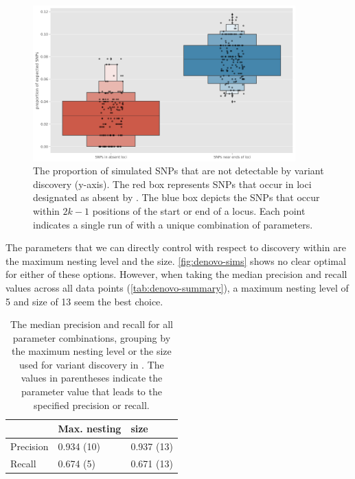 \begin{figure}
    \centering
    \includegraphics[width=0.9\textwidth]{Chapter1/Figs/denovo_errors.png}
    \caption{The proportion of simulated SNPs that are not detectable by \denovo{} variant discovery (y-axis). The red box represents SNPs that occur in loci designated as absent by \pandora{}. The blue box depicts the SNPs that occur within $2k-1$ positions of the start or end of a locus. Each point indicates a single run of \pandora{} with a unique combination of parameters.}
    \label{fig:denovo-errors}
\end{figure}

\noindent
The parameters that we can directly control with respect to \denovo{} discovery within \pandora{} are the \prg{} maximum nesting level and the \denovo{} \kmer{} size. \autoref{fig:denovo-sims} shows no clear optimal for either of these options. However, when taking the median precision and recall values across all data points (\autoref{tab:denovo-summary}), a maximum nesting level of 5 and \denovo{} \kmer{} size of 13 seem the best choice.

\begin{table}
\centering
\begin{tabular}{@{}lll@{}}
\toprule
          & Max. nesting & \denovo{} \kmer{} size \\ \midrule
Precision & 0.934 (10)   & 0.937 (13)                                               \\
Recall    & 0.674 (5)    & 0.671 (13)                                               \\ \bottomrule
\end{tabular}
\caption{The median precision and recall for all parameter combinations, grouping by the maximum \prg{} nesting level or the \denovo{} \kmer{} size used for variant discovery in \pandora{}. The values in parentheses indicate the parameter value that leads to the specified precision or recall.}
\label{tab:denovo-summary}
\end{table}

